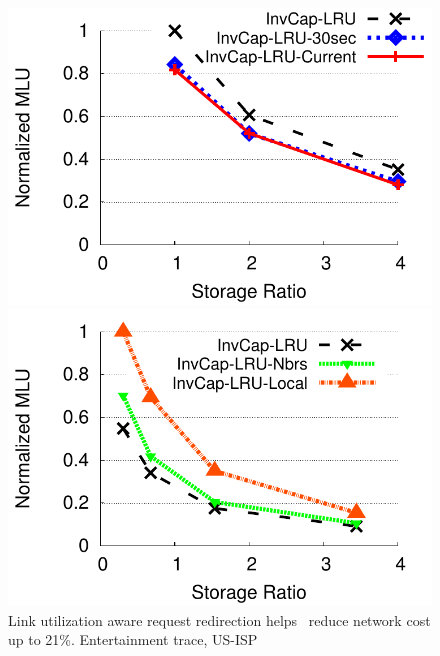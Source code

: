 


\eat
{

\begin{figure}[t]
\begin{minipage}[b]{0.31\linewidth}
\begin{center}
\includegraphics[width=\textwidth]{graphSet1/lrusnmp/ATTVideos.pdf}
\end{center}
\vspace{-0.25in}
\caption{Link utilization aware request redirection helps \invlru\ reduce network cost up to 21\%. Entertainment trace, US-ISP}
\label{fig:lrusnmp}
\end{minipage}
\vspace{-0.2in}
\hspace{0.3cm}
\begin{minipage}[b]{0.31\linewidth}
\begin{center}
\includegraphics[width=\textwidth]{graphSet1/lrulocalnew/AbileneDownloads.pdf}

\end{center}
\end{minipage}
\end{figure}}
